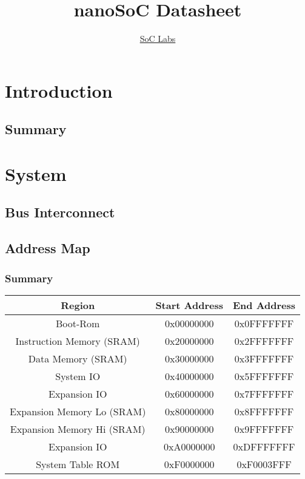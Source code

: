 \documentclass{report}
\title{nanoSoC Datasheet}
\author{\href{http://www.soclabs.org}{SoC Labs}}
\begin{document}
\maketitle


\tableofcontents
\clearpage
\chapter{Introduction}

\section{Summary}



\chapter{System}

\section{Bus Interconnect}

\section{Address Map}
\subsection{Summary}

\begin{center}
    \begin{tabular}{||c | c | c ||}
        \hline
        Region & Start Address & End Address \\ 
        \hline\hline
        Boot-Rom & 0x00000000 & 0x0FFFFFFF \\
        \hline
        Instruction Memory (SRAM) & 0x20000000 & 0x2FFFFFFF \\
        \hline
        Data Memory (SRAM) & 0x30000000 & 0x3FFFFFFF \\
        \hline
        System IO & 0x40000000 & 0x5FFFFFFF \\
        \hline
        Expansion IO & 0x60000000 & 0x7FFFFFFF \\
        \hline
        Expansion Memory Lo (SRAM) & 0x80000000 & 0x8FFFFFFF \\
        \hline
        Expansion Memory Hi (SRAM) & 0x90000000 & 0x9FFFFFFF \\
        \hline
        Expansion IO & 0xA0000000 & 0xDFFFFFFF \\
        \hline
        System Table ROM & 0xF0000000 & 0xF0003FFF \\
        \hline
    \end{tabular}
\end{center}
\end{document}
